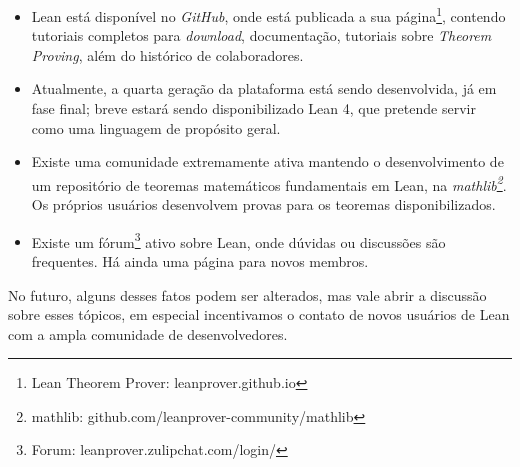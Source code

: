 \begin{itemize}
    \item Lean está disponível no \textit{GitHub}, onde está publicada a sua página\footnote{Lean Theorem Prover: leanprover.github.io}, contendo tutoriais completos para \textit{download}, documentação, tutoriais sobre \textit{Theorem Proving}, além do histórico de colaboradores.

    \item Atualmente, a quarta geração da plataforma está sendo desenvolvida, já em fase final; breve estará sendo disponibilizado Lean 4, que pretende servir como uma linguagem de propósito geral.

    \item Existe uma comunidade extremamente ativa mantendo o desenvolvimento de um repositório de teoremas matemáticos fundamentais em Lean, na \textit{mathlib\footnote{mathlib: github.com/leanprover-community/mathlib}}. Os próprios usuários desenvolvem provas para os teoremas disponibilizados.

    \item Existe um fórum\footnote{Forum: leanprover.zulipchat.com/login/} ativo sobre Lean, onde dúvidas ou discussões são frequentes. Há ainda uma página para novos membros.
\end{itemize}

\noindent No futuro, alguns desses fatos podem ser alterados, mas vale abrir a discussão sobre esses tópicos, em especial incentivamos o contato de novos usuários de Lean com a ampla comunidade de desenvolvedores.
